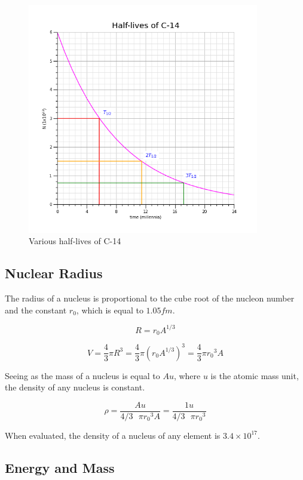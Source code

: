\documentclass[12pt]{article}
\begin{document}
\begin{figure}[H]
\centering
\includegraphics[width=0.9\textwidth,keepaspectratio]{./images/c-14_t_half.png}
\caption{Various half-lives of C-14}
\end{figure}

\subsection{Nuclear Radius}
\label{sec:orgc1e9c11}

The radius of a nucleus is proportional to the cube root of the nucleon number and the constant \(r_0\), which is equal to \(1.05fm\).

\[R = r_0 A^{1/3}\]

\[V = \dfrac{4}{3} \pi R^3 = \dfrac{4}{3} \pi (r_0 A^{1/3})^3 = \dfrac{4}{3} \pi {r_0}^3 A\]

Seeing as the mass of a nucleus is equal to \(Au\), where \(u\) is the atomic mass unit, the density of any nucleus is constant.

\[\rho = \dfrac{Au}{4/3 \text{ } \pi {r_0}^3 A} = \dfrac{1u}{4/3 \text{ } \pi {r_0}^3}\]

When evaluated, the density of a nucleus of any element is \(3.4 \times 10^{17}\).

\subsection{Energy and Mass}
\label{sec:org5c2fd22}
\end{document}
